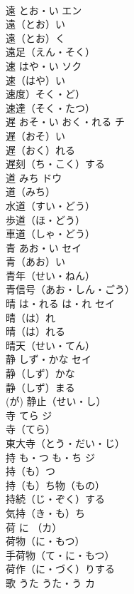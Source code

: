 \documentclass[8pt]{extreport}
\begin{document}
\begin{CJK}{UTF8}{min}
\\	遠	とお・い	エン	
\\	遠（とお）い　
\\	遠（とお）く　
\\	遠足（えん・そく）　
\\	速	はや・い	ソク	
\\	速（はや）い　
\\	速度）そく・ど）　
\\	速達（そく・たつ）　
\\	遅	おそ・い おく・れる	チ	
\\	遅（おそ）い　
\\	遅（おく）れる　
\\	遅刻（ち・こく）する　
\\	道	みち	ドウ	
\\	道（みち）　
\\	水道（すい・どう）　
\\	歩道（ほ・どう）　
\\	車道（しゃ・どう）　
\\	青	あお・い	セイ	
\\	青（あお）い　
\\	青年（せい・ねん）　
\\	青信号（あお・しん・ごう）　
\\	晴	は・れる は・れ	セイ	
\\	晴（は）れ　
\\	晴（は）れる　
\\	晴天（せい・てん）　
\\	静	しず・かな	セイ	
\\	静（しず）かな　
\\	静（しず）まる　
\\	(が) 静止（せい・し）　
\\	寺	てら	ジ	
\\	寺（てら）　
\\	東大寺（とう・だい・じ）　
\\	持	も・つ も・ち	ジ	
\\	持（も）つ　
\\	持（も）ち物（もの）　
\\	持続（じ・ぞく）する　
\\	気持（き・も）ち　
\\	荷	に	（カ）	
\\	荷物（に・もつ）　
\\	手荷物（て・に・もつ）　
\\	荷作（に・づく）りする　
\\	歌	うた うた・う	カ	

\end{CJK}
\end{document}

